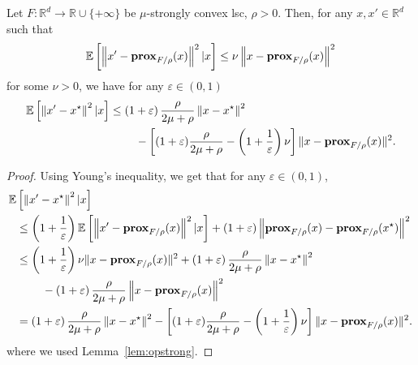 \begin{lemma}
    \label{lem:basereco}
    Let $F: \mathbb{R}^d \to \mathbb{R}\cup\{+\infty\}$ be $\mu$-strongly convex lsc, $\rho>0$. Then, for any $x,x' \in\mathbb{R}^d$ such that 
    \begin{align*}
      \mathbb{E} \left[  \left\|x' - \mathbf{prox}_{F/{\rho }}(x) \right\|^2 | x \right] \leq  \nu  \left\|x - \mathbf{prox}_{F/{\rho }}(x) \right\|^2 
    \end{align*}
    for some $\nu>0$, we have for any $\varepsilon\in(0,1)$
    \begin{align}
       \label{eq:basestrong} 
        \mathbb{E} \left[   \left\|x' - x^\star  \right\|^2 | x \right] &\leq \left( 1 + \varepsilon \right)  \frac{{\rho }}{2\mu + {\rho }}  \left\|x - x^\star \right\|^2 \\
   \nonumber     &\hspace*{0.8cm} -\left[ (1 + \varepsilon) \frac{{\rho }}{2\mu + {\rho }}  - \left( 1 + \frac{1}{\varepsilon} \right)  \nu  \right]  \|x -  \mathbf{prox}_{F/{\rho }}(x)   \|^2.
     \end{align}
\end{lemma}


\begin{proof}
     Using Young's inequality, we get that for any $\varepsilon\in(0,1)$,
\begin{align*}
    \mathbb{E} & \left[ \left\|x' - x^\star  \right\|^2  | x \right] \\
    &\leq \left( 1 + \frac{1}{\varepsilon} \right)  \mathbb{E} \left[ \left\|x' -  \mathbf{prox}_{F/{\rho }}(x)   \right\|^2  | x \right]   +   \left( 1 + \varepsilon \right)\left\| \mathbf{prox}_{F/{\rho }}(x) - \mathbf{prox}_{F/{\rho }}(x^\star ) \right\|^2 \\
    &\leq \left( 1 + \frac{1}{\varepsilon} \right)  \nu  \|x -  \mathbf{prox}_{F/{\rho }}(x)   \|^2 +   \left( 1 + \varepsilon \right)  \frac{{\rho }}{2\mu + {\rho }} \left\|x - x^\star \right\|^2 \\
    &\hspace*{0.8cm} -  \left( 1 + \varepsilon \right)  \frac{{\rho }}{2\mu + {\rho }}  \left\| x - \mathbf{prox}_{F/{\rho }}(x)  \right\|^2 \\
     &= \left( 1 + \varepsilon \right)  \frac{{\rho }}{2\mu + {\rho }}  \left\|x - x^\star \right\|^2  -\left[ (1 + \varepsilon) \frac{{\rho }}{2\mu + {\rho }}  - \left( 1 + \frac{1}{\varepsilon} \right)  \nu  \right]  \|x -  \mathbf{prox}_{F/{\rho }}(x)   \|^2.
 \end{align*}
where we used Lemma~\ref{lem:opstrong}.
\end{proof}


